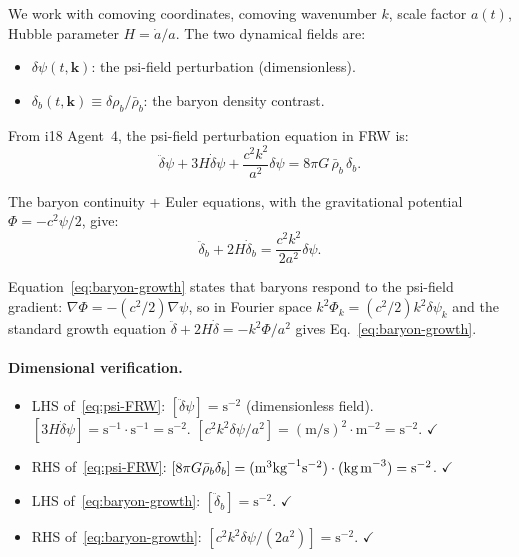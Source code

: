 \documentclass[aps,prd,twocolumn,nofootinbib]{revtex4-2}
\newcommand{\dpsi}{\delta\psi}
\begin{document}
We work with comoving coordinates, comoving wavenumber $k$, scale
factor $a(t)$, Hubble parameter $H = \dot a/a$. The two dynamical
fields are:
\begin{itemize}
\item $\dpsi(t,\mathbf{k})$: the psi-field perturbation (dimensionless).
\item $\delta_b(t,\mathbf{k}) \equiv \delta\rho_b/\bar\rho_b$: the
  baryon density contrast.
\end{itemize}

From i18 Agent~4, the psi-field perturbation equation in FRW is:
\begin{equation}
\boxed{
\ddot\dpsi + 3H\dot\dpsi + \frac{c^2 k^2}{a^2}\dpsi
= 8\pi G\,\bar\rho_b\,\delta_b.
}
\label{eq:psi-FRW}
\end{equation}

The baryon continuity + Euler equations, with the gravitational
potential $\Phi = -c^2\psi/2$, give:
\begin{equation}
\boxed{
\ddot\delta_b + 2H\dot\delta_b
= \frac{c^2 k^2}{2a^2}\dpsi.
}
\label{eq:baryon-growth}
\end{equation}

Equation~\eqref{eq:baryon-growth} states that baryons respond to
the psi-field gradient: $\nabla\Phi = -(c^2/2)\nabla\psi$, so
in Fourier space $k^2\Phi_k = (c^2/2)k^2\dpsi_k$ and the standard
growth equation $\ddot\delta + 2H\dot\delta = -k^2\Phi/a^2$ gives
Eq.~\eqref{eq:baryon-growth}.

\paragraph{Dimensional verification.}
\begin{itemize}
\item LHS of~\eqref{eq:psi-FRW}: $[\ddot\dpsi] = \text{s}^{-2}$
  (dimensionless field). $[3H\dot\dpsi] = \text{s}^{-1}\cdot\text{s}^{-1}
  = \text{s}^{-2}$. $[c^2 k^2 \dpsi/a^2] = (\text{m/s})^2
  \cdot\text{m}^{-2} = \text{s}^{-2}$. $\checkmark$
\item RHS of~\eqref{eq:psi-FRW}: $[8\pi G\bar\rho_b\delta_b]
  = (\text{m}^3\text{kg}^{-1}\text{s}^{-2})\cdot(\text{kg\,m}^{-3})
  = \text{s}^{-2}$. $\checkmark$
\item LHS of~\eqref{eq:baryon-growth}: $[\ddot\delta_b]
  = \text{s}^{-2}$. $\checkmark$
\item RHS of~\eqref{eq:baryon-growth}: $[c^2 k^2 \dpsi/(2a^2)]
  = \text{s}^{-2}$. $\checkmark$
\end{itemize}
\end{document}
